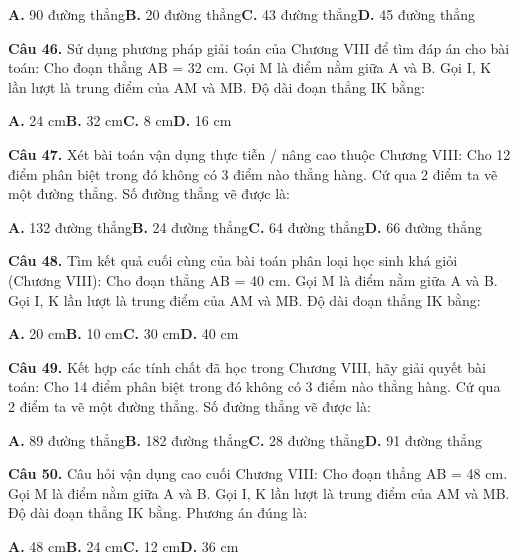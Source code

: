 \documentclass[11pt,a4paper]{article}
\begin{document}
\hspace*{1.5em}\textbf{A.} 90 đường thẳng\quad\quad \textbf{B.} 20 đường thẳng\quad\quad \textbf{C.} 43 đường thẳng\quad\quad \textbf{D.} 45 đường thẳng\par\vspace{2pt}
\textbf{\color{primary} Câu 46.} Sử dụng phương pháp giải toán của Chương VIII để tìm đáp án cho bài toán: Cho đoạn thẳng AB = 32 cm. Gọi M là điểm nằm giữa A và B. Gọi I, K lần lượt là trung điểm của AM và MB. Độ dài đoạn thẳng IK bằng:\par
\hspace*{1.5em}\textbf{A.} 24 cm\quad\quad \textbf{B.} 32 cm\quad\quad \textbf{C.} 8 cm\quad\quad \textbf{D.} 16 cm\par\vspace{2pt}
\textbf{\color{primary} Câu 47.} Xét bài toán vận dụng thực tiễn / nâng cao thuộc Chương VIII: Cho 12 điểm phân biệt trong đó không có 3 điểm nào thẳng hàng. Cứ qua 2 điểm ta vẽ một đường thẳng. Số đường thẳng vẽ được là:\par
\hspace*{1.5em}\textbf{A.} 132 đường thẳng\quad\quad \textbf{B.} 24 đường thẳng\quad\quad \textbf{C.} 64 đường thẳng\quad\quad \textbf{D.} 66 đường thẳng\par\vspace{2pt}
\textbf{\color{primary} Câu 48.} Tìm kết quả cuối cùng của bài toán phân loại học sinh khá giỏi (Chương VIII): Cho đoạn thẳng AB = 40 cm. Gọi M là điểm nằm giữa A và B. Gọi I, K lần lượt là trung điểm của AM và MB. Độ dài đoạn thẳng IK bằng:\par
\hspace*{1.5em}\textbf{A.} 20 cm\quad\quad \textbf{B.} 10 cm\quad\quad \textbf{C.} 30 cm\quad\quad \textbf{D.} 40 cm\par\vspace{2pt}
\textbf{\color{primary} Câu 49.} Kết hợp các tính chất đã học trong Chương VIII, hãy giải quyết bài toán: Cho 14 điểm phân biệt trong đó không có 3 điểm nào thẳng hàng. Cứ qua 2 điểm ta vẽ một đường thẳng. Số đường thẳng vẽ được là:\par
\hspace*{1.5em}\textbf{A.} 89 đường thẳng\quad\quad \textbf{B.} 182 đường thẳng\quad\quad \textbf{C.} 28 đường thẳng\quad\quad \textbf{D.} 91 đường thẳng\par\vspace{2pt}
\textbf{\color{primary} Câu 50.} Câu hỏi vận dụng cao cuối Chương VIII: Cho đoạn thẳng AB = 48 cm. Gọi M là điểm nằm giữa A và B. Gọi I, K lần lượt là trung điểm của AM và MB. Độ dài đoạn thẳng IK bằng. Phương án đúng là:\par
\hspace*{1.5em}\textbf{A.} 48 cm\quad\quad \textbf{B.} 24 cm\quad\quad \textbf{C.} 12 cm\quad\quad \textbf{D.} 36 cm\par\vspace{2pt}
\end{document}
